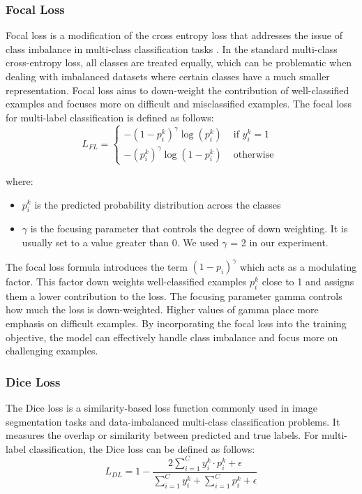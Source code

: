 \subsubsection{Focal Loss}

Focal loss is a modification of the cross entropy loss that addresses the issue of class imbalance in multi-class classification tasks \cite{lin2017focal}. In the standard multi-class cross-entropy loss, all classes are treated equally, which can be problematic when dealing with imbalanced datasets where certain classes have a much smaller representation. Focal loss aims to down-weight the contribution of well-classified examples and focuses more on difficult and misclassified examples. The focal loss for multi-label classification is defined as follows:
\begin{equation}
L_{F L}= \begin{cases}-\left(1-p_i^k\right)^\gamma \log \left(p_i^k\right) & \text { if } y_i^k=1 \\ -\left(p_i^k\right)^\gamma \log \left(1-p_i^k\right) & \text { otherwise }\end{cases}
\end{equation}

where:
\begin{itemize}
\item{$p_i^k$ is the predicted probability distribution across the classes}
\item{\(\gamma\) is the focusing parameter that controls the degree of down weighting. It is usually set to a value greater than 0. We used \(\gamma\) = 2 in our experiment.}
\end{itemize}
The focal loss formula introduces the term \((1 - p_{i})^{\gamma}\) which acts as a modulating factor. This factor down weights well-classified examples 
\(p_i^k\) close to 1 and assigns them a lower contribution to the loss. The focusing parameter gamma controls how much the loss is down-weighted. Higher values of gamma place more emphasis on difficult examples.
By incorporating the focal loss into the training objective, the model can effectively handle class imbalance and focus more on challenging examples.

\subsubsection{Dice Loss}
The Dice loss is a similarity-based loss function commonly used in image segmentation tasks and data-imbalanced multi-class classification problems. It measures the overlap or similarity between predicted and true labels. For multi-label classification, the Dice loss can be defined as follows:
\begin{equation}
L_{DL} = 1 - \frac{2 \sum_{i=1}^C y_i^k \cdot p_i^k+\epsilon}{\sum_{i=1}^C y_i^k+\sum_{i=1}^C p_i^k+\epsilon}
\end{equation}

